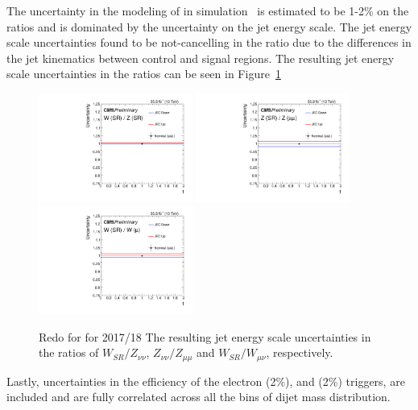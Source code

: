 The uncertainty in the modeling of \MET in simulation~\cite{Khachatryan:2014gga} 
is estimated to be 1-2\% on the ratios and is dominated by the uncertainty on the jet energy scale. The
jet energy scale uncertainties found to be not-cancelling in the ratio due to the differences in the 
jet kinematics between control and signal regions. The resulting jet energy scale uncertainties in the 
ratios can be seen in Figure~\ref{fig:unc_jec}

\begin{figure}[!htb]
\begin{center}
  \includegraphics[width=0.45\textwidth]{fig/unc/jec_ratio_WJets_signal_signal_1.pdf}
  \includegraphics[width=0.45\textwidth]{fig/unc/jec_ratio_ZtoNuNu_signal_dimuon_1.pdf}
  \includegraphics[width=0.45\textwidth]{fig/unc/jec_ratio_WJets_signal_singlemuon_1.pdf}
\caption{{\color{red} Redo for for 2017/18} The resulting jet energy scale uncertainties in the ratios of $W_{SR}/Z_{\nu\nu}$, $Z_{\nu\nu}/Z_{\mu\mu}$ and $W_{SR}/W_{\mu\nu}$, respectively.}
\label{fig:unc_jec}
\end{center}\end{figure}

Lastly, uncertainties in the efficiency of the electron (2\%), and \ptmiss (2\%) triggers, are included and are fully correlated 
across all the bins of dijet mass distribution. 

